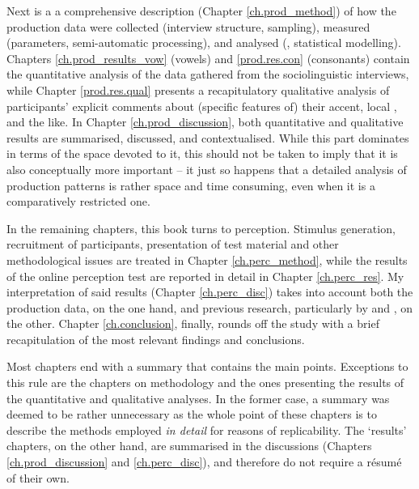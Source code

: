 Next is a a comprehensive description (Chapter \ref{ch.prod_method}) of how the production data were collected (interview structure, sampling), measured (parameters, semi-auto\-matic processing), and analysed (, statistical modelling).
Chapters \ref{ch.prod_results_vow} (vowels) and \ref{prod.res.con} (consonants) contain the quantitative analysis of the data gathered from the sociolinguistic interviews, while Chapter \ref{prod.res.qual} presents a recapitulatory qualitative analysis of participants' explicit comments about (specific features of) their accent, local , and the like.
In Chapter \ref{ch.prod_discussion}, both quantitative and qualitative results are summarised, discussed, and contextualised.
While this part dominates in terms of the space devoted to it, this should not be taken to imply that it is also conceptually more important -- it just so happens that a detailed analysis of production patterns is rather space and time consuming, even when it is a comparatively restricted one.

In the remaining chapters, this book turns to perception.
Stimulus generation, recruitment of participants, presentation of test material and other methodological issues are treated in Chapter \ref{ch.perc_method}, while the results of the online perception test are reported in detail in Chapter \ref{ch.perc_res}.
My interpretation of said results (Chapter \ref{ch.perc_disc}) takes into account both the production data, on the one hand, and previous research, particularly by \textcite{hayetal2006a} and \textcite{haydrager2010}, on the other.
Chapter \ref{ch.conclusion}, finally, rounds off the study with a brief recapitulation of the most relevant findings and conclusions.

Most chapters end with a summary that contains the main points.
Exceptions to this rule are the chapters on methodology and the ones presenting the results of the quantitative and qualitative analyses.
In the former case, a summary was deemed to be rather unnecessary as the whole point of these chapters is to describe the methods employed \emph{in detail} for reasons of replicability.
The `results' chapters, on the other hand, are summarised in the discussions (Chapters \ref{ch.prod_discussion} and \ref{ch.perc_disc}), and therefore do not require a résumé of their own.
